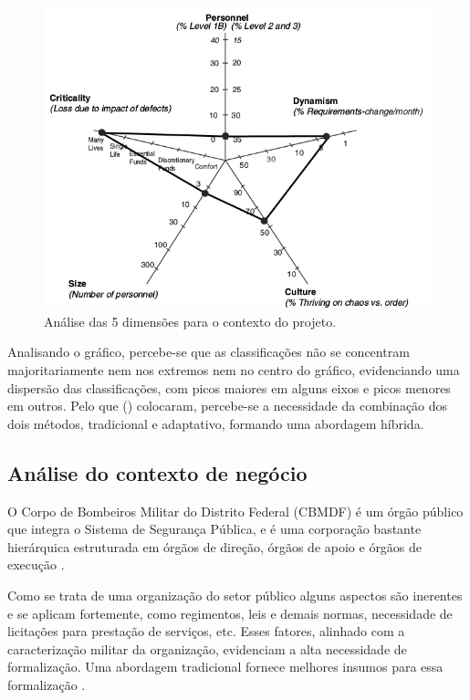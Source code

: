     \begin{figure}[!htbp]
      \centering
      \includegraphics[scale=0.5]{editaveis/figuras/Dimensions_Afecting_Method_Selection_nosso_contexto}
      \caption[Análise das 5 dimensões para o contexto do projeto]{Análise das 5 dimensões para o contexto do projeto.}
      \label{dimensions_nosso_projeto}
    \end{figure}
    
    Analisando o gráfico, percebe-se que as classificações não se concentram majoritariamente nem nos extremos nem no centro
    do gráfico, evidenciando uma dispersão das classificações, com picos maiores em alguns eixos e picos menores em outros.
    Pelo que \citeauthor{boehm} (\citeyear{boehm}) colocaram, percebe-se a necessidade da combinação dos dois métodos, tradicional
    e adaptativo, formando uma abordagem híbrida.
    
    \subsection{Análise do contexto de negócio}
      
	O Corpo de Bombeiros Militar do Distrito Federal (CBMDF) é um órgão público que integra o Sistema de Segurança Pública,
	e é uma corporação bastante hierárquica estruturada em órgãos de direção, órgãos de apoio e órgãos de execução
	\cite{brasil91}.
	
	Como se trata de uma organização do setor público alguns aspectos são inerentes e se aplicam fortemente, como regimentos,
	leis e demais normas, necessidade de licitações para prestação de serviços, etc. Esses fatores, alinhado com a
	caracterização militar da organização, evidenciam a alta necessidade de formalização. Uma abordagem tradicional
	fornece melhores insumos para essa formalização \cite{boehm}.
	
